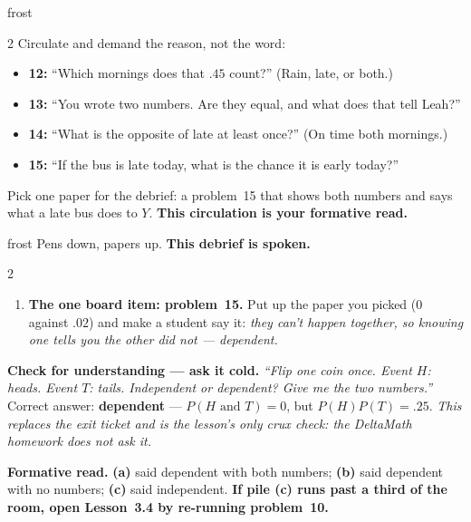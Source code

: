 \documentclass[10pt]{article}
\begin{document}
\begin{skillbox}{frost}
\begin{multicols}{2}
Circulate and demand the reason, not the word:
\begin{itemize}[leftmargin=1.1em, nosep]
  \item \textbf{12:} ``Which mornings does that $.45$ count?'' (Rain, late, or both.)
  \item \textbf{13:} ``You wrote two numbers. Are they equal, and what does that tell Leah?''
  \item \textbf{14:} ``What is the opposite of late at least once?'' (On time both mornings.)
  \item \textbf{15:} ``If the bus is late today, what is the chance it is early today?''
\end{itemize}
Pick one paper for the debrief: a problem~15 that shows both numbers and says what a late bus
does to $Y$. \textbf{This circulation is your formative read.}
\end{multicols}
\end{skillbox}

\boxguard[24]
\begin{skillbox}{frost}
Pens down, papers up. \textbf{This debrief is spoken.}
\begin{multicols}{2}
\begin{enumerate}[leftmargin=1.3em, nosep, itemsep=3pt]
  \item \textbf{The one board item: problem~15.} Put up the paper you picked ($0$ against $.02$)
        and make a student say it: \emph{they can't happen together, so knowing one tells you
        the other did not --- dependent.}
\end{enumerate}
\columnbreak
\textbf{Check for understanding --- ask it cold.} \emph{``Flip one coin once. Event $H$: heads.
Event $T$: tails. Independent or dependent? Give me the two numbers.''} Correct answer:
\textbf{dependent} --- $P(H \text{ and } T) = 0$, but $P(H)P(T) = .25$. \emph{This replaces the
exit ticket and is the lesson's only crux check: the DeltaMath homework does not ask it.}

\textbf{Formative read.} \textbf{(a)} said dependent with both numbers; \textbf{(b)} said
dependent with no numbers; \textbf{(c)} said independent. \textbf{If pile (c) runs past a third
of the room, open Lesson~3.4 by re-running problem~10.}
\end{multicols}
\end{skillbox}
\end{document}
